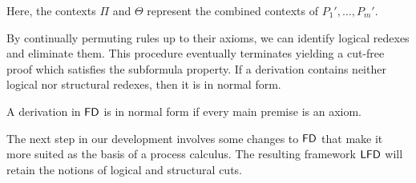 Here, the contexts $\Pi$ and $\Theta$ represent the combined contexts
of $P_1', \hdots, P_m'$.

By continually permuting rules up to their axioms, we can identify logical redexes
and eliminate them. This procedure eventually terminates yielding a
cut-free proof which satisfies the subformula property. If a derivation contains
neither logical nor structural redexes, then it is in normal form.

\begin{definition}
  A derivation in $\textsf{FD}$ is in normal form if every main premise is an axiom.
\end{definition}

The next step in our development involves some changes to $\textsf{FD}$ that make
it more suited as the basis of a process calculus. The resulting
framework $\textsf{LFD}$ will retain the notions of logical and structural cuts.
